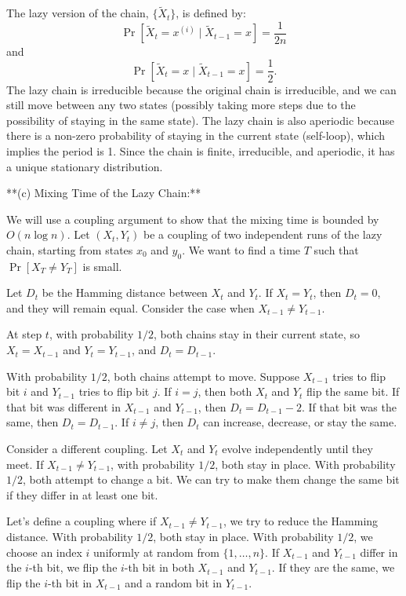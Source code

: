 \begin{enumerate}
\begin{shaded}
The lazy version of the chain, $\{\tilde{X}_t\}$, is defined by:
\[
\Pr[\tilde{X}_t = x^{(i)} \mid \tilde{X}_{t-1} = x] = \frac{1}{2n}
\]
and
\[
\Pr[\tilde{X}_t = x \mid \tilde{X}_{t-1} = x] = \frac{1}{2}.
\]
The lazy chain is irreducible because the original chain is irreducible, and we can still move between any two states (possibly taking more steps due to the possibility of staying in the same state). The lazy chain is also aperiodic because there is a non-zero probability of staying in the current state (self-loop), which implies the period is 1. Since the chain is finite, irreducible, and aperiodic, it has a unique stationary distribution.

**(c) Mixing Time of the Lazy Chain:**

We will use a coupling argument to show that the mixing time is bounded by $O(n \log n)$. Let $(X_t, Y_t)$ be a coupling of two independent runs of the lazy chain, starting from states $x_0$ and $y_0$. We want to find a time $T$ such that $\Pr[X_T \neq Y_T]$ is small.

Let $D_t$ be the Hamming distance between $X_t$ and $Y_t$. If $X_t = Y_t$, then $D_t = 0$, and they will remain equal. Consider the case when $X_{t-1} \neq Y_{t-1}$.

At step $t$, with probability $1/2$, both chains stay in their current state, so $X_t = X_{t-1}$ and $Y_t = Y_{t-1}$, and $D_t = D_{t-1}$.

With probability $1/2$, both chains attempt to move. Suppose $X_{t-1}$ tries to flip bit $i$ and $Y_{t-1}$ tries to flip bit $j$.
If $i = j$, then both $X_t$ and $Y_t$ flip the same bit. If that bit was different in $X_{t-1}$ and $Y_{t-1}$, then $D_t = D_{t-1} - 2$. If that bit was the same, then $D_t = D_{t-1}$.
If $i \neq j$, then $D_t$ can increase, decrease, or stay the same.

Consider a different coupling. Let $X_t$ and $Y_t$ evolve independently until they meet. If $X_{t-1} \neq Y_{t-1}$, with probability $1/2$, both stay in place. With probability $1/2$, both attempt to change a bit. We can try to make them change the same bit if they differ in at least one bit.

Let's define a coupling where if $X_{t-1} \neq Y_{t-1}$, we try to reduce the Hamming distance. With probability $1/2$, both stay in place. With probability $1/2$, we choose an index $i$ uniformly at random from $\{1, \dots, n\}$. If $X_{t-1}$ and $Y_{t-1}$ differ in the $i$-th bit, we flip the $i$-th bit in both $X_{t-1}$ and $Y_{t-1}$. If they are the same, we flip the $i$-th bit in $X_{t-1}$ and a random bit in $Y_{t-1}$.


\end{shaded}
\end{enumerate}
